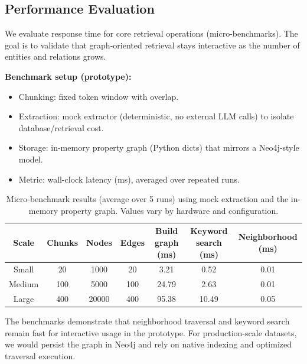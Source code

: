 \subsection{Performance Evaluation}
We evaluate response time for core retrieval operations (micro-benchmarks). The goal is to validate that graph-oriented retrieval stays interactive as the number of entities and relations grows.

\textbf{Benchmark setup (prototype):}
\begin{itemize}
	\item Chunking: fixed token window with overlap.
	\item Extraction: mock extractor (deterministic, no external LLM calls) to isolate database/retrieval cost.
	\item Storage: in-memory property graph (Python dicts) that mirrors a Neo4j-style model.
	\item Metric: wall-clock latency (ms), averaged over repeated runs.
\end{itemize}

\begin{table}[h]
\centering
\begin{tabular}{|c|c|c|c|c|c|c|}
\hline
\textbf{Scale} & \textbf{Chunks} & \textbf{Nodes} & \textbf{Edges} & \textbf{Build graph (ms)} & \textbf{Keyword search (ms)} & \textbf{Neighborhood (ms)} \\
\hline
Small & 20 & 1000 & 20 & 3.21 & 0.52 & 0.01 \\
\hline
Medium & 100 & 5000 & 100 & 24.79 & 2.63 & 0.01 \\
\hline
Large & 400 & 20000 & 400 & 95.38 & 10.49 & 0.05 \\
\hline
\end{tabular}
\caption{Micro-benchmark results (average over 5 runs) using mock extraction and the in-memory property graph. Values vary by hardware and configuration.}
\end{table}

The benchmarks demonstrate that neighborhood traversal and keyword search remain fast for interactive usage in the prototype. For production-scale datasets, we would persist the graph in Neo4j and rely on native indexing and optimized traversal execution.